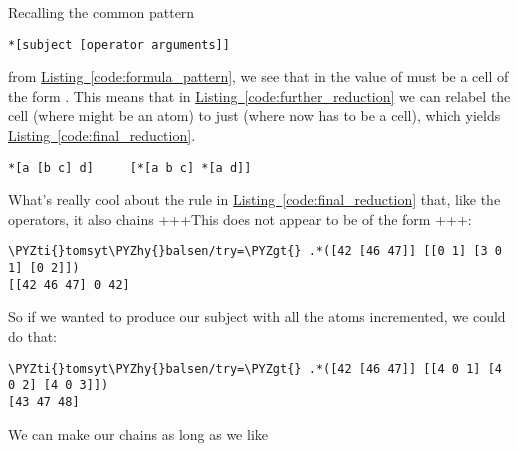 Recalling the common pattern

\begin{framed_shaded}
\begin{Verbatim}[fontsize=\relsize{-2.5},commandchars=\\\{\}]
*[subject [operator arguments]]
\end{Verbatim}
\end{framed_shaded}

from \hyperref[code:formula_pattern]{Listing~\ref{code:formula_pattern}}, we see that in \kode{*[a d]} the value of  must be a cell of the form . This means that in \hyperref[code:further_reduction]{Listing~\ref{code:further_reduction}} we can relabel the cell  (where  might be an atom) to just  (where now  has to be a cell), which yields \hyperref[code:final_reduction]{Listing~\ref{code:final_reduction}}.

\begin{codelisting}
\label{code:final_reduction}
\codecaption{}
\begin{Verbatim}[fontsize=\relsize{-2.5},commandchars=\\\{\}]
*[a [b c] d]     [*[a b c] *[a d]]
\end{Verbatim}
\end{codelisting}

What's really cool about the rule in \hyperref[code:final_reduction]{Listing~\ref{code:final_reduction}} that, like the operators, it also chains +++This does not appear to be of the form \kode{*[a [b c] d]}+++:

\begin{framed_shaded}
\begin{Verbatim}[fontsize=\relsize{-2.5},commandchars=\\\{\}]
\PYZti{}tomsyt\PYZhy{}balsen/try=\PYZgt{} .*([42 [46 47]] [[0 1] [3 0 1] [0 2]])
[[42 46 47] 0 42]
\end{Verbatim}
\end{framed_shaded}
So if we wanted to produce our subject with all the atoms incremented, we could
do that:

\begin{framed_shaded}
\begin{Verbatim}[fontsize=\relsize{-2.5},commandchars=\\\{\}]
\PYZti{}tomsyt\PYZhy{}balsen/try=\PYZgt{} .*([42 [46 47]] [[4 0 1] [4 0 2] [4 0 3]])
[43 47 48]
\end{Verbatim}
\end{framed_shaded}
We can make our chains as long as we like

